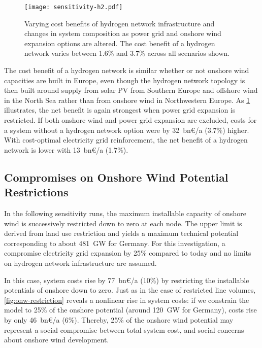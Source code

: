\begin{figure}
    \centering
    \texttt{[image: sensitivity-h2.pdf]}
    \caption{Varying cost benefits of hydrogen network infrastructure and changes in system composition as power grid and onshore wind expansion options are altered. The cost benefit of a hydrogen network varies between 1.6\% and 3.7\% across all scenarios shown.}
    \label{fig:h2-restriction-w-onw}
\end{figure}

The cost benefit of a hydrogen network is similar whether or not onshore wind
capacities are built in Europe, even though the hydrogen network topology is
then built around supply from solar PV from Southern Europe and offshore wind in
the North Sea rather than from onshore wind in Northwestern Europe. As
\cref{fig:h2-restriction-w-onw} illustrates, the net benefit is again strongest
when power grid expansion is restricted. If both onshore wind and power grid
expansion are excluded, costs for a system without a hydrogen network option
were by 32~bn\euro/a (3.7\%) higher. With cost-optimal electricity grid
reinforcement, the net benefit of a hydrogen network is lower with
13~bn\euro/a (1.7\%).

\subsection{Compromises on Onshore Wind Potential Restrictions}
\label{sec:si:onw-compromise}

In the following sensitivity runs, the maximum installable capacity of onshore
wind is successively restricted down to zero at each node. The upper limit is
derived from land use restriction and yields a maximum technical potential
corresponding to about \SI{481}{\giga\watt} for Germany. For this investigation,
a compromise electricity grid expansion by 25\% compared to today and no limits
on hydrogen network infrastructure are assumed.

In this case, system costs rise by 77~bn\euro/a (10\%)
by restricting the installable potentials of onshore down to zero. Just as in
the case of restricted line volumes, \cref{fig:onw-restriction} reveals a
nonlinear rise in system costs: if we constrain the model to 25\% of the onshore
potential (around 120~GW for Germany), costs rise by only 46~bn\euro/a (6\%).
Thereby, 25\% of the onshore wind potential may represent a social compromise
between total system cost, and social concerns about onshore wind development.

